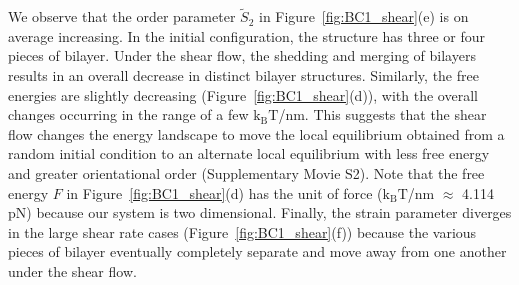 \documentclass[prb,preprint,showpacs,preprintnumbers,amsmath,amssymb,longbibliography]{revtex4-1}
\begin{document}
We observe that the order parameter $\tilde S_2$ in
Figure~\ref{fig:BC1_shear}(e) is on average increasing. In the initial
configuration, the structure has three or four pieces of bilayer.
%
Under the shear flow, the shedding and merging of bilayers results in an
overall decrease in distinct bilayer structures. Similarly, the free
energies are slightly decreasing (Figure~\ref{fig:BC1_shear}(d)), with
the overall changes occurring in the range of a few $\mathrm{k_BT}$/nm.
This suggests that the shear flow changes the energy landscape to move
the local equilibrium obtained from a random initial condition to an
alternate local equilibrium with less free energy and greater
orientational order  (Supplementary Movie S2).  Note that the free energy $F$ in
Figure~\ref{fig:BC1_shear}(d) has the unit of force ($\mathrm{k_BT}$/nm $\approx$ 4.114 pN)
because our system
is two dimensional.
%
%
Finally, the strain parameter diverges in the large shear rate cases
(Figure~\ref{fig:BC1_shear}(f))
because the various pieces of bilayer eventually completely separate and move away from one another
under the shear flow.
\end{document}
